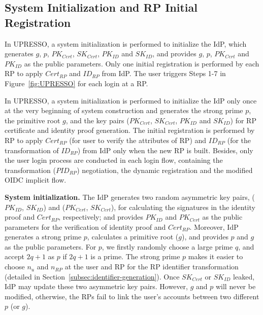\subsection{System Initialization and RP Initial Registration}

In UPRESSO, a system initialization is performed to initialize the IdP, which generates $g$, $p$, $PK_{Cert}$, $SK_{Cert}$, $PK_{ID}$ and $SK_{ID}$,
and provides  $g$, $p$, $PK_{Cert}$ and $PK_{ID}$ as the public parameters.
Only one initial registration is performed by each RP to apply  $Cert_{RP}$ and $ID_{RP}$ from IdP.
The user triggers Steps 1-7 in Figure~\ref{fig:UPRESSO} for each login at a RP.

In UPRESSO, a system initialization is performed to initialize the IdP only once at the very beginning of system construction and generates the strong prime $p$, the primitive root $g$, and the key pairs ($PK_{Cert}$, $SK_{Cert}$, $PK_{ID}$ and $SK_{ID}$) for RP certificate and identity proof generation. The initial registration is performed by RP to apply $Cert_{RP}$ (for user to verify the attributes of RP) and $ID_{RP}$ (for the transformation of $ID_{RP}$) from IdP only when the new RP is built.
Besides, only the user login process are conducted in each login flow, containing the transformation ($PID_{RP}$) negotiation, the dynamic registration and the modified OIDC implicit flow.

\vspace{1mm}\noindent \textbf{System initialization.} The IdP generates two random asymmetric key pairs, ($PK_{ID}$, $SK_{ID}$) and ($PK_{Cert}$, $SK_{Cert}$),
for calculating the signatures in the identity proof and $Cert_{RP}$, respectively;
and provides $PK_{ID}$ and $PK_{Cert}$ as the public parameters for the verification of identity proof and $Cert_{RP}$.
Moreover, IdP generates a strong prime $p$, calculates  a primitive root ($g$), and provides $p$ and $g$ as the public parameters.
For $p$, we firstly randomly choose a large prime $q$, and accept  $2q+1$ as $p$ if $2q+1$ is a prime.
The strong prime $p$ makes it easier to choose $n_{u}$ and $n_{RP}$ at the user and RP for the RP identifier transformation (detailed in  Section~\ref{subsec:identifier-generation}). %
Once $SK_{Cert}$ or $SK_{ID}$ leaked, IdP may update these two asymmetric key pairs.
However, $g$ and $p$ will never be modified, otherwise, the RPs fail to link the user's accounts between two different $p$ (or $g$).


